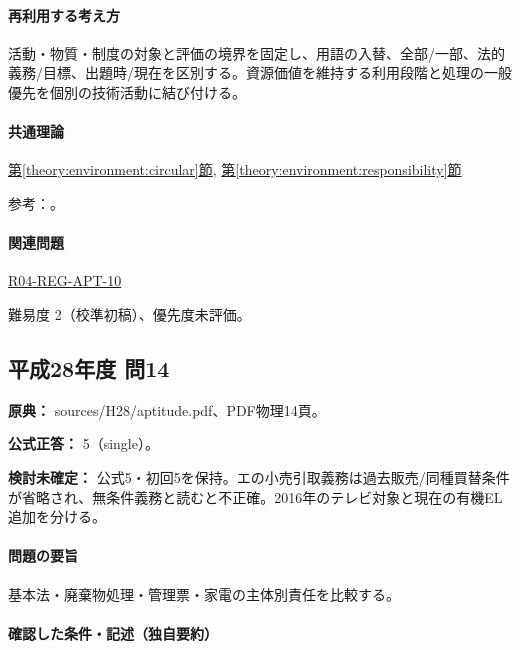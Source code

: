 \paragraph{再利用する考え方} 活動・物質・制度の対象と評価の境界を固定し、用語の入替、全部/一部、法的義務/目標、出題時/現在を区別する。資源価値を維持する利用段階と処理の一般優先を個別の技術活動に結び付ける。

\paragraph{共通理論} \hyperref[theory:environment:circular]{第\ref*{theory:environment:circular}節}, \hyperref[theory:environment:responsibility]{第\ref*{theory:environment:responsibility}節}

\par 参考：\cite{env_circular_law,env_circular_outline}。

\paragraph{関連問題} \hyperref[q:r04-reg-apt-10]{R04-REG-APT-10}

\par 難易度 2（校準初稿）、優先度未評価。

\subsection{平成28年度 問14}
\label{q:h28-reg-apt-14}

\noindent\textbf{原典：} sources/H28/aptitude.pdf、PDF物理14頁。

\textbf{公式正答：} 5（single）。

\par\textbf{検討未確定：} 公式5・初回5を保持。エの小売引取義務は過去販売/同種買替条件が省略され、無条件義務と読むと不正確。2016年のテレビ対象と現在の有機EL追加を分ける。

\paragraph{問題の要旨} 基本法・廃棄物処理・管理票・家電の主体別責任を比較する。

\paragraph{確認した条件・記述（独自要約）}\mbox{}\par

